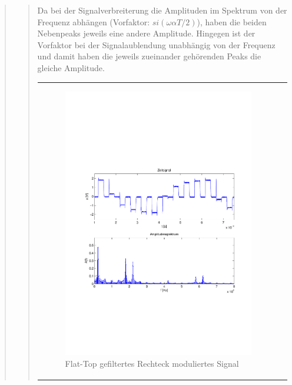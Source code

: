 \begin{quote}
\begin{quote}
            Da bei der Signalverbreiterung die Amplituden im Spektrum von der Frequenz abhängen (Vorfaktor: $si(\omega
             \alpha T/2)$), haben die beiden Nebenpeaks jeweils eine andere Amplitude. Hingegen ist der Vorfaktor bei
             der Signalaublendung unabhängig von der Frequenz und damit haben die jeweils zueinander
             gehörenden Peaks die gleiche Amplitude.
      
      
      
      \begin{center}
            \begin{tabular}{ll}
            
            \hspace{-4cm}
                \begin{minipage}{0.6\textwidth}
                    \begin{figure}[H]
                        \includegraphics[scale=0.55, trim = 16mm 70mm 16mm 85mm, clip]{Bilder/flatrecFil20_05abget_zeit}
                          \caption{Flat-Top gefiltertes Rechteck moduliertes Signal}
		                  \label{fig:flatrecFil20_05zeit}
                    \end{figure}
                \end{minipage}
                

\end{tabular}
\end{center}
\end{quote}
\end{quote}

